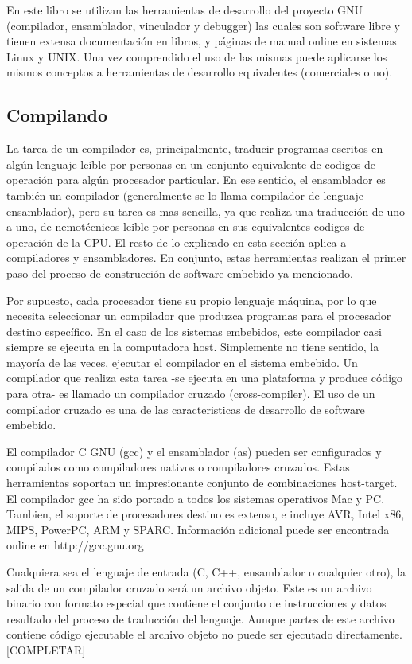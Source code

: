\documentclass[12pt]{article}
\begin{document}
En este libro se utilizan las herramientas de desarrollo del proyecto GNU
(compilador, ensamblador, vinculador y debugger) las cuales son software libre
y tienen extensa documentación en libros, y páginas de manual online en sistemas
Linux y UNIX. Una vez comprendido
el uso de las mismas puede aplicarse los mismos conceptos a herramientas
de desarrollo equivalentes (comerciales o no).

\subsection *{Compilando}

La tarea de un compilador es, principalmente, traducir programas escritos en 
algún lenguaje leíble por personas en un conjunto equivalente
de codigos de operación para algún procesador particular. En ese sentido,
el ensamblador es también un compilador (generalmente se lo llama
compilador de lenguaje ensamblador), pero su tarea es mas sencilla, ya que
realiza una traducción de uno a uno, de nemotécnicos leible por personas
en sus equivalentes codigos de operación de la CPU. El resto de lo explicado en esta sección
aplica a compiladores y ensambladores. En conjunto, estas herramientas
realizan el primer paso del proceso de construcción de software embebido
ya mencionado.

Por supuesto, cada procesador tiene su propio lenguaje máquina, por lo que
necesita seleccionar un compilador que produzca programas para el procesador
destino específico. En el caso de los sistemas embebidos,  este compilador
casi siempre se ejecuta en la computadora host. Simplemente no tiene sentido,
la mayoría de las veces, ejecutar el compilador en el sistema embebido.
Un compilador que realiza esta tarea -se ejecuta en una plataforma  y produce
código para otra- es llamado un compilador cruzado (cross-compiler). El uso de
un compilador cruzado es una de las caracteristicas de desarrollo de software
embebido.

El compilador C GNU (gcc) y el ensamblador (as) pueden ser configurados y compilados
como compiladores nativos o compiladores cruzados. Estas herramientas soportan
un impresionante conjunto de combinaciones host-target. El compilador gcc ha sido
portado a todos los sistemas operativos Mac y PC. Tambien, el soporte de procesadores destino
es extenso, e incluye AVR, Intel x86, MIPS, PowerPC, ARM y SPARC. Información
adicional puede ser encontrada online en http://gcc.gnu.org

Cualquiera sea el lenguaje de entrada (C, C++, ensamblador o cualquier otro), la salida
de un compilador cruzado será un archivo objeto. Este es un archivo binario con
formato especial que contiene el conjunto de instrucciones y datos
resultado del proceso de traducción del lenguaje. Aunque partes de este archivo
contiene código ejecutable el archivo objeto no puede ser ejecutado directamente.
[COMPLETAR]
\end{document}
